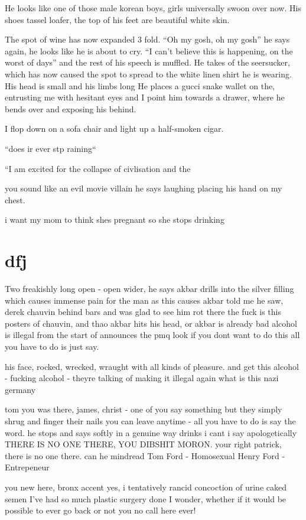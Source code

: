 \documentclass[19pt,openany]{book}
\begin{document}
He looks like one of those male korean boys,
girls universally swoon over now. His shoes
tassel loafer, the top of his feet
are beautiful white skin.

The spot of wine has now expanded 3 fold.
``Oh my gosh, oh my gosh'' he says again,
he looks like he is about to cry. ``I can't believe
this is happening, on the worst of days''
and the
rest of his speech is muffled. He takes of the seersucker,
which has now caused the spot to spread to the white
linen shirt he is wearing.
His head is small and his limbs long
He places a gucci snake wallet on the, entrusting
me with hesitant eyes and I point him towards a
drawer, where he bends over and exposing his behind.

I flop down on a sofa chair and light up a half-smoken
cigar.

``does ir ever stp raining``

``I am excited for the collapse of civlisation
and the

you sound like an evil movie villain he says laughing
placing his hand on my chest.

i want my mom to think shes pregnant so she stops drinking

\chapter*{dfj}
Two freakishly long
open - open wider, he says
akbar drills into the silver filling which causes immense pain for the man as
this causes
akbar told me he saw, derek chauvin behind bars
and was glad to see him rot there
the fuck is this
posters of chauvin, and thao
akbar hits his head, or akbar is already bad
alcohol is illegal from the start of
announces the pmq
look if you dont want to
do this all you have to do is
just say.

his face, rocked, wrecked, wraught
with all kinds of pleasure.
and get this alcohol - fucking alcohol - theyre talking of making it illegal
again what is this nazi germany

tom you was there, james, christ - one of you say something
but they simply shrug and finger their nails
you can leave anytime - all you have to do is say the word. he stops and
says softly in a genuine way
drinks
i cant i say apologetically
THERE IS NO ONE THERE, YOU DIBSHIT MORON.
your right patrick, there is no one there.
can he mindread
Tom Ford - Homosexual
Henry Ford - Entrepeneur

you new here, bronx accent
yes, i tentatively
rancid concoction of urine caked semen
I've had so much plastic surgery done I wonder, whether
if it would be possible to ever go back
or not
you no call here ever!
\end{document}
